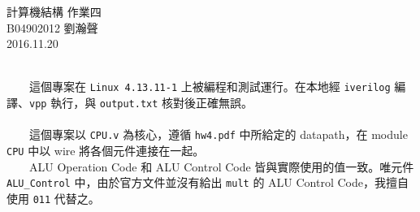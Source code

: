 \documentclass{report}
\begin{document}
\pagestyle{plain}
\fontsize{12pt}{20pt}\selectfont
\begin{center}
	\Huge{計算機結構 作業四}\\ 
	\huge{B04902012 劉瀚聲}\\ 
	\huge{2016.11.20}\\ 
\end{center}
	
\\
　　這個專案在 \texttt{Linux 4.13.11-1} 上被編程和測試運行。在本地經 \texttt{iverilog} 編譯、\texttt{vpp} 執行，與 \texttt{output.txt} 核對後正確無誤。\\

\\
　　這個專案以 \texttt{CPU.v} 為核心，遵循 \texttt{hw4.pdf} 中所給定的 datapath，在 module \texttt{CPU} 中以 wire 將各個元件連接在一起。\\
　　ALU Operation Code 和 ALU Control Code 皆與實際使用的值一致。唯元件 \texttt{ALU\_Control} 中，由於官方文件並沒有給出 \texttt{mult} 的 ALU Control Code，我擅自使用 \texttt{011} 代替之。\\
\end{document}
